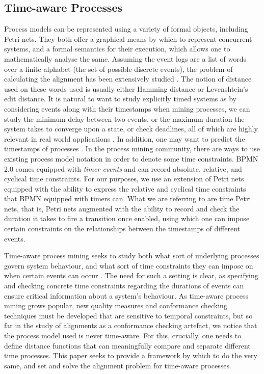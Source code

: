 \documentclass[conference]{IEEEtran}
\begin{document}
	\subsection{Time-aware Processes}
	
	Process models can be represented using a variety of formal objects, including Petri nets. 
	They both offer a graphical means by which to represent concurrent systems, and a formal semantics for their execution, which allows one to mathematically analyse the same. 
	Assuming the event logs are a list of words over a finite alphabet (the set of possible discrete events), the problem of calculating the alignment has been extensively studied \cite{Adriansyah2014AligningOA} \cite{BCC21}. 
	The notion of distance used on these words used is usually either Hamming distance or Levenshtein's edit distance. 
	It is natural to want to study explicitly timed systems
	as by considering events along with their timestamps when mining processes, we can study the minimum delay between two events, or the maximum duration the system takes to converge upon a state, or check deadlines, all of which are highly relevant in real world applications \cite{Cheikhrouhou2014TheTP} \cite{Eder1999TimeCI} \cite{inbook}. 
	In addition, one may want to predict the timestamps of processes \cite{SSA11}. 
	In the process mining community, there are ways to use existing process model notation in order to denote some time constraints. BPMN 2.0 comes equipped with \emph{timer events} and can record absolute, relative, and cyclical time constraints. 
	For our purposes, we use an extension of Petri nets equipped with the ability to express the relative and cyclical time constraints that BPMN equipped with timers can. 
	What we are referring to are time Petri nets, that is, Petri nets augmented with the ability to record and check the duration it takes to fire a transition once enabled, using which one can impose certain constraints on the relationships between the timestamps of different events. 
	
	Time-aware process mining seeks to study both what sort of underlying processes govern system behaviour, and what sort of time constraints they can impose on when certain events can occur \cite{RMAW13} \cite{CRHA20}  \cite{AS21}. 
	The need for such a setting is clear, as specifying and checking concrete time constraints regarding the durations of events can ensure critical information about a system's behaviour. 
	As time-aware process mining grows popular, new quality measures and conformance checking techniques must be developed that are sensitive to temporal constraints, but so far in the study of alignments as a conformance checking artefact, we notice that the process model used is never time-aware. 
	For this, crucially, one needs to define distance functions that can meaningfully compare and separate different time processes. 
	This paper seeks to provide a framework by which to do the very same, and set and solve the alignment problem for time-aware processes.
	
\end{document}
